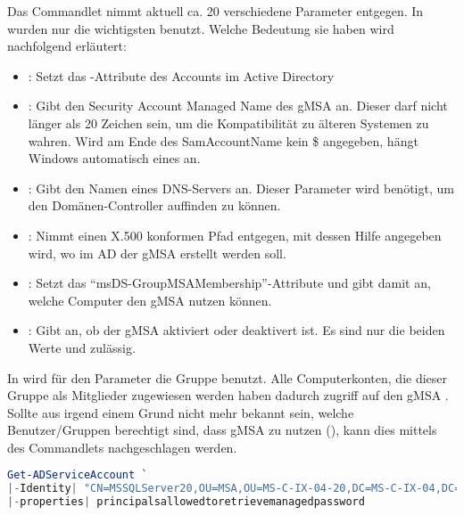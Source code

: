         Das Commandlet  nimmt aktuell
        ca. 20 verschiedene Parameter entgegen. In  wurden
        nur die wichtigsten benutzt. Welche Bedeutung sie haben wird nachfolgend
        erläutert:
        \begin{itemize}
            \item {}: Setzt das -Attribute
            des Accounts im Active Directory
            \item {}: Gibt den Security
            Account Managed Name des gMSA an. Dieser darf nicht länger als 20
            Zeichen sein, um die Kompatibilität zu älteren Systemen zu wahren.
            Wird am Ende des SamAccountName kein \$ angegeben, hängt Windows
            automatisch eines an.
            \item {}: Gibt den Namen eines
            DNS-Servers an. Dieser Parameter wird benötigt, um den
            Domänen-Controller auffinden zu können.
            \item {}: Nimmt einen X.500 konformen Pfad
            entgegen, mit dessen Hilfe angegeben wird, wo im AD der gMSA erstellt
            werden soll.
            \item
            :
            Setzt das \enquote{msDS-GroupMSAMembership}-Attribute und gibt damit
            an, welche Computer den gMSA nutzen können.
            \item {}: Gibt an, ob der gMSA aktiviert
            oder deaktivert ist. Es sind nur die beiden Werte
             und 
            zulässig.
        \end{itemize}
        In wird für den Parameter
         die
        Gruppe  benutzt. Alle Computerkonten, die dieser
        Gruppe als Mitglieder zugewiesen werden haben dadurch zugriff auf den gMSA
        .
        Sollte aus irgend einem Grund nicht mehr bekannt sein, welche
        Benutzer/Gruppen berechtigt sind, dass gMSA zu nutzen
        (), kann
        dies mittels des Commandlets 
        nachgeschlagen werden.
        \begin{lstlisting}[language=powershell, caption={Einer Gruppe ein
        Mitglied hinzufügen}, label=create_msa_5]
Get-ADServiceAccount `
|-Identity| "CN=MSSQLServer20,OU=MSA,OU=MS-C-IX-04-20,DC=MS-C-IX-04,DC=FUS" `
|-properties| principalsallowedtoretrievemanagedpassword
        \end{lstlisting}
        \begin{literaturinternet}
          \item \cite{hh852236}
          \item \cite{ee617258}
          \item \cite{askpfeplat20121217}
        \end{literaturinternet}
